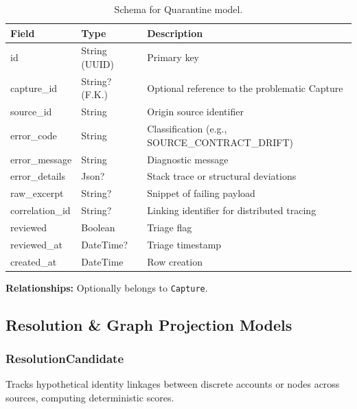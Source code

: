 \begin{table}[h]
\centering
\begin{tabular}{|l|l|l|}
\hline
\textbf{Field} & \textbf{Type} & \textbf{Description} \\
\hline
id & String (UUID) & Primary key \\
capture\_id & String? (F.K.) & Optional reference to the problematic Capture \\
source\_id & String & Origin source identifier \\
error\_code & String & Classification (e.g., SOURCE\_CONTRACT\_DRIFT) \\
error\_message & String & Diagnostic message \\
error\_details & Json? & Stack trace or structural deviations \\
raw\_excerpt & String? & Snippet of failing payload \\
correlation\_id & String? & Linking identifier for distributed tracing \\
reviewed & Boolean & Triage flag \\
reviewed\_at & DateTime? & Triage timestamp \\
created\_at & DateTime & Row creation \\
\hline
\end{tabular}
\caption{Schema for Quarantine model.}
\end{table}
\noindent \textbf{Relationships:} Optionally belongs to \texttt{Capture}.

\subsection{Resolution \& Graph Projection Models}

\subsubsection{ResolutionCandidate}
Tracks hypothetical identity linkages between discrete accounts or nodes across sources, computing deterministic scores.

